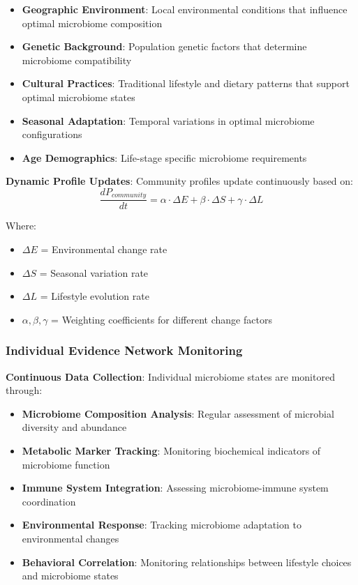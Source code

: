 \documentclass[12pt,a4paper]{article}
\begin{document}
\begin{itemize}
\item \textbf{Geographic Environment}: Local environmental conditions that influence optimal microbiome composition
\item \textbf{Genetic Background}: Population genetic factors that determine microbiome compatibility  
\item \textbf{Cultural Practices}: Traditional lifestyle and dietary patterns that support optimal microbiome states
\item \textbf{Seasonal Adaptation}: Temporal variations in optimal microbiome configurations
\item \textbf{Age Demographics}: Life-stage specific microbiome requirements
\end{itemize}

\textbf{Dynamic Profile Updates}:
Community profiles update continuously based on:
\begin{equation}
\frac{dP_{community}}{dt} = \alpha \cdot \Delta E + \beta \cdot \Delta S + \gamma \cdot \Delta L
\end{equation}

Where:
\begin{itemize}
\item $\Delta E$ = Environmental change rate
\item $\Delta S$ = Seasonal variation rate  
\item $\Delta L$ = Lifestyle evolution rate
\item $\alpha, \beta, \gamma$ = Weighting coefficients for different change factors
\end{itemize}

\subsubsection{Individual Evidence Network Monitoring}

\textbf{Continuous Data Collection}:
Individual microbiome states are monitored through:

\begin{itemize}
\item \textbf{Microbiome Composition Analysis}: Regular assessment of microbial diversity and abundance
\item \textbf{Metabolic Marker Tracking}: Monitoring biochemical indicators of microbiome function
\item \textbf{Immune System Integration}: Assessing microbiome-immune system coordination
\item \textbf{Environmental Response}: Tracking microbiome adaptation to environmental changes
\item \textbf{Behavioral Correlation}: Monitoring relationships between lifestyle choices and microbiome states
\end{itemize}
\end{document}
